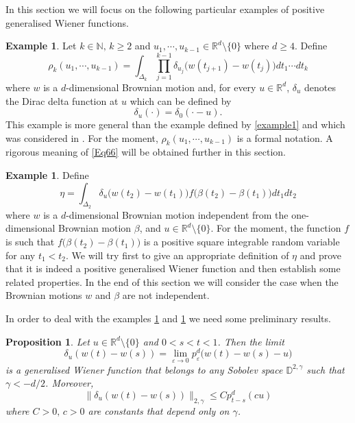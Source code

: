 \documentclass[]{interact}
\newcommand{\R}{{\mathbb{R}}}
\newcommand{\D}{{\mathbb{D}}}
\newcommand{\1}{\mathbf{1}}
\theoremstyle{plain}%
\newtheorem{prop}[thm]{Proposition}
\theoremstyle{definition}
\newtheorem{example}[thm]{Example}
\theoremstyle{remark}
\begin{document}
In this section we will focus on the following particular examples of positive generalised Wiener functions.


\begin{example}\label{Example1} Let $k\in \mathbb{N},\, k\geqslant 2$ and $u_1,\cdots, u_{k-1}\in\R^d\setminus\{0\}$ where $d\geqslant 4$. Define
\begin{equation} \label{Eq66}
 \rho_k(u_1,\cdots,u_{k-1})=\int_{\Delta_k} \prod_{j=1}^{k-1}  \delta_{u_j}\big( w(t_{j+1})-w(t_j)\big)dt_1\cdots dt_k 
\end{equation}
where $w$ is a $d$-dimensional Brownian motion and, for every $u\in \R^d$, $\delta_u$ denotes the Dirac delta function at $u$ which can be defined by 
$$ \delta_u(\cdot)=\delta_0(\cdot -u). $$ 
This example is more general than the example defined by \eqref{example1} and which was considered in \cite{DS23}. For the moment, $\rho_k(u_1,\cdots,u_{k-1})$ is a formal notation. A rigorous meaning of \eqref{Eq66} will be obtained further in this section.
\end{example}


\begin{example} \label{Example2} Define
\begin{equation}\label{Eq217}
\eta=\int _{\Delta_2} \delta_u \big(w(t_2)-w(t_1) \big) f\big( \beta(t_2)-\beta(t_1)\big ) dt_1dt_2 
\end{equation}  
where $w$ is a $d$-dimensional Brownian motion independent from the one-dimensional Brownian motion $\beta$, and $u\in \R^d\setminus \{0\}$. For the moment, the function $f$ is such that $f\big( \beta(t_2)-\beta(t_1)\big )$ is a positive square integrable random variable for any $t_1<t_2$. We will try first to give an appropriate definition of $\eta$ and prove that it is indeed a positive generalised Wiener function and then establish some related properties. In the end of this section we will consider the case when the Brownian motions $w$ and $\beta$ are not independent.
\end{example}

In order to deal with the examples \ref{Example1} and \ref{Example2} we need some preliminary results.


\begin{prop}\label{prop1}
Let $u\in \R^d\setminus\{0\}$ and $0<s<t<1$. Then the limit 
$$ \delta_u(w(t)-w(s))=\lim_{\varepsilon \to 0}  p^d_{\varepsilon}\big( w(t )-w(s)-u) $$
is a generalised Wiener function that belongs to any Sobolev space $\D^{2,\gamma}$ such that $\gamma < -d/2$. Moreover,
$$ \big \| \delta_u(w(t)-w(s)) \big\| _{2,\gamma} \leqslant C p^d_{t-s}(cu) $$
where $C>0,\, c>0$ are constants that depend only on $\gamma$.
\end{prop}
\end{document}
